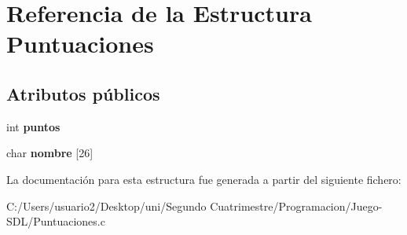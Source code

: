 \hypertarget{struct_puntuaciones}{}\section{Referencia de la Estructura Puntuaciones}
\label{struct_puntuaciones}
\subsection*{Atributos públicos}
\begin{DoxyCompactItemize}
\item 
int {\bfseries puntos}\hypertarget{struct_puntuaciones_a4661e5b2c08f1eaf08c50d4c4ea4e77e}{}\label{struct_puntuaciones_a4661e5b2c08f1eaf08c50d4c4ea4e77e}

\item 
char {\bfseries nombre} \mbox{[}26\mbox{]}\hypertarget{struct_puntuaciones_a9fcaa027c6b67cabc20c0d64180f747c}{}\label{struct_puntuaciones_a9fcaa027c6b67cabc20c0d64180f747c}

\end{DoxyCompactItemize}


La documentación para esta estructura fue generada a partir del siguiente fichero\+:\begin{DoxyCompactItemize}
\item 
C\+:/\+Users/usuario2/\+Desktop/uni/\+Segundo Cuatrimestre/\+Programacion/\+Juego-\/\+S\+D\+L/Puntuaciones.\+c\end{DoxyCompactItemize}
